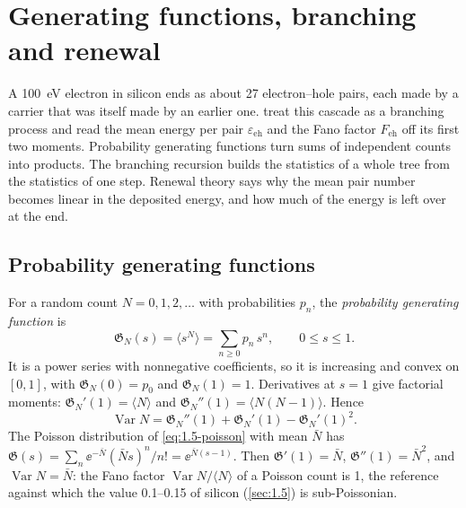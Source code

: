 \section{Generating functions, branching and renewal}\label{app:C.11}

A \SI{100}{eV} electron in silicon ends as about 27 electron--hole pairs, each made by a carrier that was itself made by an earlier one.  treat this cascade as a branching process and read the mean energy per pair $\varepsilon_{\mathrm{eh}}$ and the Fano factor $F_{\mathrm{eh}}$ off its first two moments. Probability generating functions turn sums of independent counts into products. The branching recursion builds the statistics of a whole tree from the statistics of one step. Renewal theory says why the mean pair number becomes linear in the deposited energy, and how much of the energy is left over at the end.

\subsection{Probability generating functions}

For a random count $N = 0, 1, 2, \dots$ with probabilities $p_n$, the \emph{probability generating function} is
\begin{equation}
  \mathfrak{G}_N(s) = \langle s^N\rangle = \sum_{n\ge0} p_n\,s^n, \qquad 0 \le s \le 1 .
  \label{eq:C.11-pgf}
\end{equation}
It is a power series with nonnegative coefficients, so it is increasing and convex on $[0, 1]$, with $\mathfrak{G}_N(0) = p_0$ and $\mathfrak{G}_N(1) = 1$. Derivatives at $s = 1$ give factorial moments: $\mathfrak{G}_N'(1) = \langle N\rangle$ and $\mathfrak{G}_N''(1) = \langle N(N - 1)\rangle$. Hence
\begin{equation}
  \operatorname{Var}N = \mathfrak{G}_N''(1) + \mathfrak{G}_N'(1) - \mathfrak{G}_N'(1)^2 .
  \label{eq:C.11-var}
\end{equation}
The Poisson distribution of \cref{eq:1.5-poisson} with mean $\bar N$ has $\mathfrak{G}(s) = \sum_n\ee^{-\bar N}(\bar Ns)^n/n! = \ee^{\bar N(s - 1)}$. Then $\mathfrak{G}' (1)= \bar N$, $\mathfrak{G}''(1) = \bar N^2$, and $\operatorname{Var}N = \bar N$: the Fano factor $\operatorname{Var}N/\langle N\rangle$ of a Poisson count is 1, the reference against which the value 0.1--0.15 of silicon (\cref{sec:1.5}) is sub-Poissonian.

